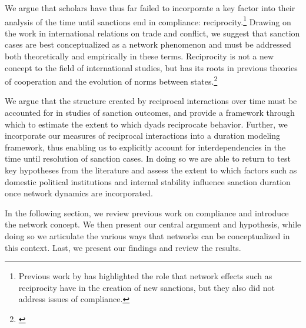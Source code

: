 We argue that scholars have thus far failed to incorporate a key factor into their analysis of the time until sanctions end in compliance: reciprocity.\footnote{Previous work by \cite{cranmer2014reciprocity} has highlighted the role that network effects such as reciprocity have in the creation of new sanctions, but they also did not address issues of compliance.} Drawing on the work in international relations on trade and conflict, we suggest that sanction cases are best conceptualized as a network phenomenon and must be addressed both theoretically and empirically in these terms. Reciprocity is not a new concept to the field of international studies, but has its roots in previous theories of cooperation and the evolution of norms between states.\footnote{\cite{richardsonai:1960,choucri:north:1972,goldstein1991reciprocity,rajmaira1990evolving,ward1992reciprocity}} 


We argue that the structure created by reciprocal interactions over time must be accounted for in studies of sanction outcomes, and provide a framework through which to estimate the extent to which dyads reciprocate behavior. Further, we incorporate our measures of reciprocal interactions into a duration modeling framework, thus enabling us to explicitly account for interdependencies in the time until resolution of sanction cases. In doing so we are able to return to test key hypotheses from the literature and assess the extent to which factors such as domestic political institutions and internal stability influence sanction duration once network dynamics are incorporated.  

In the following section, we review previous work on compliance and introduce the network concept. We then present our central argument and hypothesis, while doing so we articulate the various ways that networks can be conceptualized in this context. Last, we present our findings and review the results.
